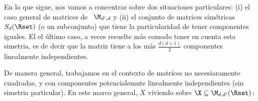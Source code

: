 En lo que sigue, nos vamos  a concentrar sobre dos situaciones particulares: (i)
el  caso general de  matrices de  \ $\M_{d',d}$  y (ii)  el conjunto  de matrices
sim\'etricas  $S_d(\Rset)$ (o  un subconjunto)  que tiene  la  particularidad de
tener componentes  iguales. El el \'ultimo  caso, a veces  resuelte m\'as comodo
tener en  cuenta esta  simetria, es  de decir que  la matriz  tiene a  los m\'as
$\frac{d (d+1)}{2}$ componentes linealmente independientes.





\label{Sssec:MP:MatricesAleatoriasGeneral}

De  manera general,  trabajamos en  el  contexto de  matrices no  necesiaramente
cuadradas,  y  con componentes  potencialemnte  linealmente independientes  (sin
simetria particular).  En este marco  general, $X$ viviendo sobre  $\X \subseteq
\M_{d,d'}(\Rset)$:
%
